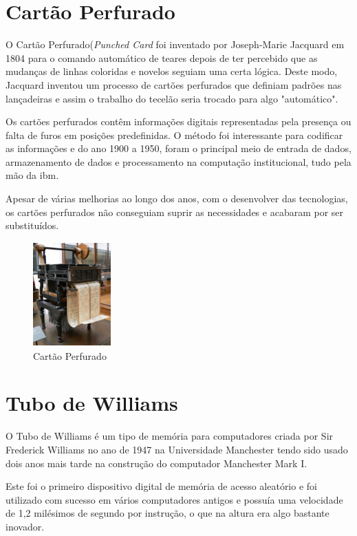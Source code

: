 \documentclass{report}
\begin{document}
	\section{Cartão Perfurado}	
		
		O Cartão Perfurado(\textit{Punched Card} foi inventado por Joseph-Marie Jacquard em 1804 para o comando automático de teares depois de ter percebido que as mudanças de linhas coloridas e novelos  seguiam uma certa lógica. Deste modo, Jacquard inventou um processo de cartões perfurados que definiam padrões nas lançadeiras e assim o trabalho do tecelão seria trocado para algo "automático". 
		
		Os cartões perfurados contêm informações digitais representadas pela presença ou falta de furos em posições predefinidas. O método foi interessante para codificar as informações e do ano 1900 a 1950, foram o principal meio de entrada de dados, armazenamento de dados e processamento na computação institucional, tudo pela mão da \ac{ibm}. 
		
		Apesar de várias melhorias ao longo dos anos, com o desenvolver das tecnologias, os cartões perfurados não conseguiam suprir as necessidades e acabaram por ser substituídos.
		
		\begin{figure}[h]
		\centering
		\includegraphics[width=3cm, height=4cm]{cartaoperfurado.jpg}
		\caption{Cartão Perfurado}
		\end{figure}
\newpage

		\section{Tubo de Williams}
		O Tubo de Williams é um tipo de memória para computadores criada por Sir Frederick Williams no ano de 1947 na Universidade Manchester tendo sido usado dois anos mais tarde na construção do computador Manchester Mark I.
	
	Este foi o primeiro dispositivo digital de memória de acesso aleatório e foi utilizado com sucesso em vários computadores antigos e possuía uma velocidade de 1,2 milésimos de segundo por instrução, o que na altura era algo bastante inovador.
	
\end{document}
